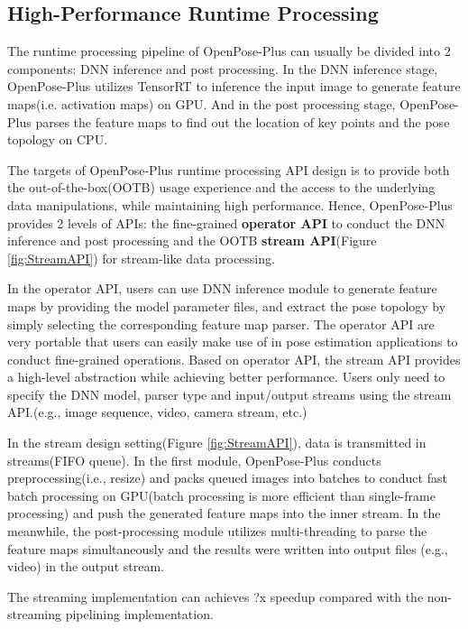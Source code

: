 \documentclass[twoside,11pt]{article}
\begin{document}
\subsection{High-Performance Runtime Processing}

The runtime processing pipeline of OpenPose-Plus can usually be divided into 2 components: DNN inference and post processing. In the DNN inference stage, OpenPose-Plus utilizes TensorRT\citep{x} to inference the input image to generate feature maps(i.e. activation maps) on GPU. And in the post processing stage, OpenPose-Plus parses the feature maps to find out the location of key points and the pose topology on CPU.

The targets of OpenPose-Plus runtime processing API design is to provide both the out-of-the-box(OOTB) usage experience and the access to the underlying data manipulations, while maintaining high performance. Hence, OpenPose-Plus provides 2 levels of APIs: the fine-grained \textbf{operator API} to conduct the DNN inference and post processing and the OOTB \textbf{stream API}(Figure \ref{fig:StreamAPI}) for stream-like data processing.

In the operator API, users can use DNN inference module to generate feature maps by providing the model parameter files, and extract the pose topology by simply selecting the corresponding feature map parser. The operator API are very portable that users can easily make use of in pose estimation applications to conduct fine-grained operations. Based on operator API, the stream API provides a high-level abstraction while achieving better performance. Users only need to specify the DNN model, parser type and input/output streams using the stream API.(e.g., image sequence, video, camera stream, etc.)

In the stream design setting(Figure \ref{fig:StreamAPI}), data is transmitted in streams(FIFO queue). In the first module, OpenPose-Plus conducts preprocessing(i.e., resize) and packs queued images into batches to conduct fast batch processing on GPU(batch processing is more efficient than single-frame processing) and push the generated feature maps into the inner stream. In the meanwhile, the post-processing module utilizes multi-threading to parse the feature maps simultaneously and the results were written into output files (e.g., video) in the output stream. 

The streaming implementation can achieves ?x speedup compared with the non-streaming pipelining implementation.
\end{document}
